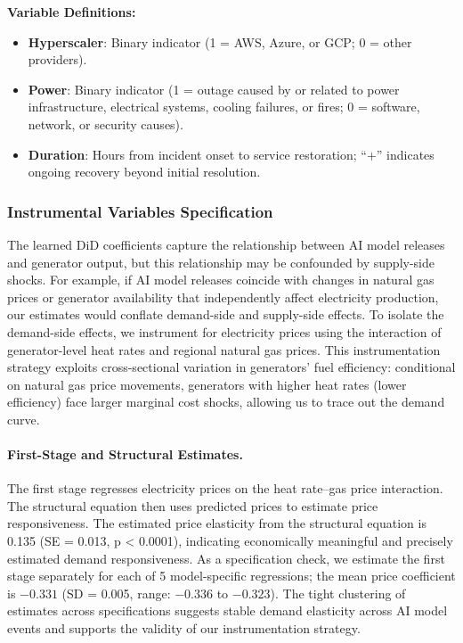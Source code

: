 \documentclass[sigconf]{acmart}
\begin{document}
\vspace{1em}
\noindent\textbf{Variable Definitions:}
\begin{itemize}
    \item \textbf{Hyperscaler}: Binary indicator (1 = AWS, Azure, or GCP; 0 = other providers).
    \item \textbf{Power}: Binary indicator (1 = outage caused by or related to power infrastructure, electrical systems, cooling failures, or fires; 0 = software, network, or security causes).
    \item \textbf{Duration}: Hours from incident onset to service restoration; ``+'' indicates ongoing recovery beyond initial resolution.
\end{itemize}

\subsubsection{Instrumental Variables Specification}\label{IVDetails}

The learned DiD coefficients capture the relationship between AI model releases and generator output, but this relationship may be confounded by supply-side shocks. For example, if AI model releases coincide with changes in natural gas prices or generator availability that independently affect electricity production, our estimates would conflate demand-side and supply-side effects. To isolate the demand-side effects, we instrument for electricity prices using the interaction of generator-level heat rates and regional natural gas prices. This instrumentation strategy exploits cross-sectional variation in generators' fuel efficiency: conditional on natural gas price movements, generators with higher heat rates (lower efficiency) face larger marginal cost shocks, allowing us to trace out the demand curve.

\paragraph{First-Stage and Structural Estimates.} The first stage regresses electricity prices on the heat rate--gas price interaction. The structural equation then uses predicted prices to estimate price responsiveness. The estimated price elasticity from the structural equation is 0.135 (SE = 0.013, p < 0.0001), indicating economically meaningful and precisely estimated demand responsiveness. As a specification check, we estimate the first stage separately for each of 5 model-specific regressions; the mean price coefficient is $-0.331$ (SD = 0.005, range: $-0.336$ to $-0.323$). The tight clustering of estimates across specifications suggests stable demand elasticity across AI model events and supports the validity of our instrumentation strategy.
\end{document}
